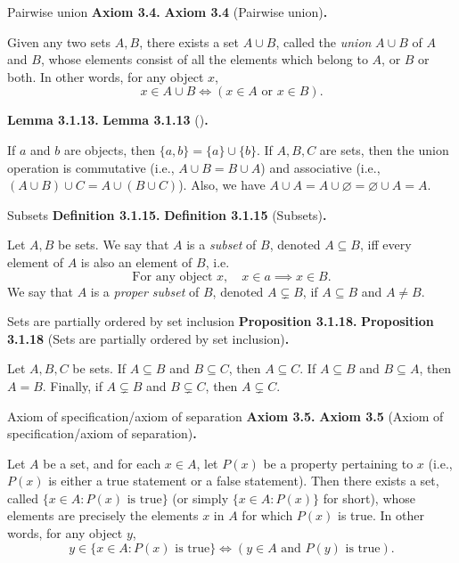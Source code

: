\documentclass[12pt]{article}
\newenvironment{df}[2][\relax]{
\vspace{4mm}
    \noindent\setlength{\parskip}{1em}%
    \ifx#1\relax%
        \textbf{#2. }%
    \else%
        \textbf{#2} (#1)\textbf{. }%
    \fi%
    \ignorespaces%
}{}
\theoremstyle{remark}
\begin{document}
\begin{df}[Pairwise union]{Axiom 3.4}
    Given any two sets $A, B$, there exists a set $A \cup B$, called the \emph{union} $A \cup B$ of $A$ and $B$, whose elements consist of all the elements which belong to $A$, or $B$ or both.
    In other words, for any object $x$,
    {\setlength{\belowdisplayskip}{-10pt} \setlength{\belowdisplayshortskip}{-10pt}
    \[
        x \in A \cup B \iff (x \in A \text{ or } x \in B).
    \]
    }
\end{df}


\begin{df}{Lemma 3.1.13}
    If $a$ and $b$ are objects, then $\{ a, b \} = \{ a \} \cup \{ b \}$.
    If $A, B, C$ are sets, then the union operation is commutative (i.e., $A \cup B = B \cup A$) and associative (i.e., $(A \cup B) \cup C = A \cup (B \cup C)$).
    Also, we have $A \cup A = A \cup \varnothing = \varnothing \cup A = A$.
\end{df}


\begin{df}[Subsets]{Definition 3.1.15}
    Let $A, B$ be sets.
    We say that $A$ is a \emph{subset} of $B$, denoted $A \subseteq B$, iff every element of $A$ is also an element of $B$, i.e.
    \[
        \text{For any object } x, \quad x \in a \implies x \in B.
    \]
    We say that $A$ is a \emph{proper subset} of $B$, denoted $A \subsetneq B$, if $A \subseteq B$ and $A \ne B$.
\end{df}


\begin{df}[Sets are partially ordered by set inclusion]{Proposition 3.1.18}
    Let $A, B, C$ be sets.
    If $A \subseteq B$ and $B \subseteq C$, then $A \subseteq C$.
    If $A \subseteq B$ and $B \subseteq A$, then $A = B$.
    Finally, if $A \subsetneq B$ and $B \subsetneq C$, then $A \subsetneq C$.
\end{df}


\begin{df}[Axiom of specification/axiom of separation]{Axiom 3.5}
    Let $A$ be a set, and for each $x \in A$, let $P(x)$ be a property pertaining to $x$ (i.e., $P(x)$ is either a true statement or a false statement).
    Then there exists a set, called $\{x \in A : P(x) \text{ is true} \}$ (or simply $\{x \in A : P(x)\}$ for short), whose elements are precisely the elements $x$ in $A$ for which $P(x)$ is true.
    In other words, for any object $y$,
    {\setlength{\belowdisplayskip}{-10pt} \setlength{\belowdisplayshortskip}{-10pt}
    \[
        y \in \{ x \in A : P(x) \text{ is true} \} \iff (y \in A \text{ and } P(y) \text{ is true}).
    \]
    }
\end{df}
\end{document}
